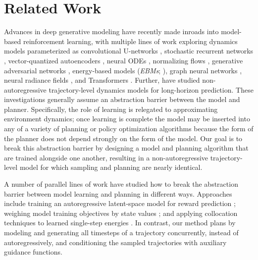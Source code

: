 \vspace{-.15cm}
\section{Related Work}



Advances in deep generative modeling have recently made inroads into model-based reinforcement learning, with multiple lines of work exploring dynamics models parameterized as
convolutional U-networks \cite{kaiser2019mbatari},
stochastic recurrent networks \cite{ke2018modeling,hafner2018planet,ha2018worldmodels},
vector-quantized autoencoders \cite{hafner2021mastering,ozair2021vector},
neural ODEs \cite{du2020ode},
normalizing flows \cite{rhinehart2020imitative,janner2020gamma},
generative adversarial networks \cite{eysenbach2021mismatched},
energy-based models (\emph{EBMs}; \citealt{du2019model}),
graph neural networks  \cite{sanchez-gonzalez2018graph},
neural radiance fields \cite{li2021scene},
and Transformers \citep{janner2021sequence,chen2021transdreamer}.
Further, \citealt{lambert2020learning} have studied non-autoregressive trajectory-level dynamics models for long-horizon prediction.
These investigations generally assume an abstraction barrier between the model and planner.
Specifically, the role of learning is relegated to approximating environment dynamics; once learning is complete the model may be inserted into any of a variety of planning \cite{botev2013cem,grady2015mppi} or policy optimization \cite{sutton1990dyna,wang2019benchmarking} algorithms because the form of the planner does not depend strongly on the form of the model.
Our goal is to break this abstraction barrier by designing a model and planning algorithm that are trained alongside one another,
resulting in a non-autoregressive trajectory-level model for which sampling and planning are nearly identical.

A number of parallel lines of work have studied how to break the abstraction barrier between model learning and planning in different ways.
Approaches include training an autoregressive latent-space model for reward prediction \citep{tamar2016vin, oh2017vpn,schrittwieser2019muzero}; weighing model training objectives by state values \citep{farahmand2017valueaware}; and applying collocation techniques to learned single-step energies \citep{du2019model, rybkin2021model}.
In contrast, our method plans by modeling and generating all timesteps of a trajectory concurrently, instead of autoregressively, and conditioning the sampled trajectories with auxiliary guidance functions.

